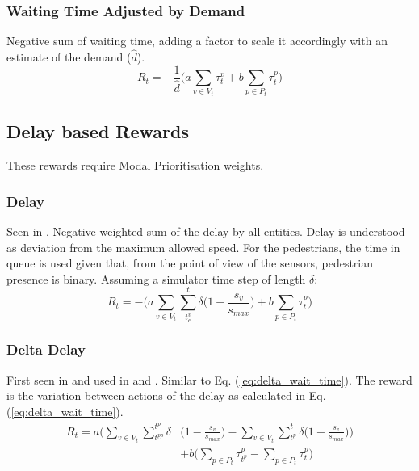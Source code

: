 \documentclass[conference]{IEEEtran}
\begin{document}
\subsubsection{Waiting Time Adjusted by Demand}
Negative sum of waiting time, adding a factor to scale it accordingly with an estimate of the demand ($\hat{d}$).
\begin{equation}
   R_t = -\frac{1}{\hat{d}} \bigg( a \sum_{v \in V_t} \tau^v_{t} + b \sum_{p \in P_t} \tau^p_{t} \bigg)
\label{eq:wait_time_norm} 
\end{equation}

\subsection{Delay based Rewards}
These rewards require Modal Prioritisation weights.
\subsubsection{Delay}
Seen in \cite{wan2018}. Negative weighted sum of the delay by all entities. Delay is understood as deviation from the maximum allowed speed. 
For the pedestrians, the time in queue is used given that, from the point of view of the sensors, pedestrian presence is binary.
Assuming a simulator time step of length $\delta$:
\begin{equation}
    R_t = - \bigg( a \sum_{v \in V_t}  \sum_{t^v_e}^t \delta \big( 1-\frac{s_v}{s_{max}} \big) + b \sum_{p \in P_t} \tau^p_t \bigg)
\label{eq:delay}
\end{equation}

\subsubsection{Delta Delay}
First seen in \cite{abdulhai2010} and used in \cite{mannion} \cite{genders2016} \cite{gao2017} \cite{mousavi2017} and \cite{gendersstate}.
Similar to Eq. (\ref{eq:delta_wait_time}).
The reward is the variation between actions of the delay as calculated in Eq. (\ref{eq:delta_wait_time}).
\begin{equation}
\begin{split}
R_t =  a \bigg( \sum_{v \in V_t} \sum_{t^{pp}}^{t^p} \delta & \big( 1-\frac{s_v}{s_{max}} \big) - \sum_{v \in V_t}  \sum_{t^p}^t \delta \big( 1-\frac{s_v}{s_{max}} \big) \bigg) \\
& + b \bigg( \sum_{p \in P_t} \tau^p_{t^p} - \sum_{p \in P_t} \tau^p_{t} \bigg) 
\end{split}
\label{eq:changedelay} 
\end{equation}
\end{document}
